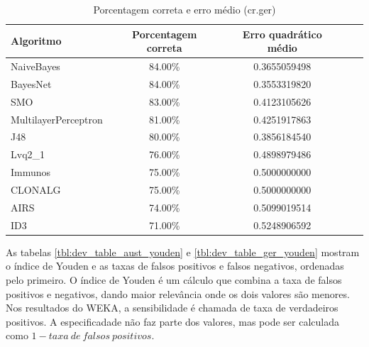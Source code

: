 \vspace{0.5cm}
\begin{table}[h!]
    \centering
    \caption{Porcentagem correta e erro médio (cr.ger)}
    \label{tbl:dev_table_ger_correct}
    \vspace{0.5cm}
    \begin{tabular}{|l|c|c|c|c|}
        \hline
        \textbf{Algoritmo} & \textbf{Porcentagem correta} & \textbf{Erro quadrático médio} \\
        \hline
        \rowcolor[gray]{.9}
        NaiveBayes           & 84.00\% & 0.3655059498 \\ \hline
        \rowcolor[gray]{.9}
        BayesNet             & 84.00\% & 0.3553319820 \\ \hline
        \rowcolor[gray]{.9}
        SMO                  & 83.00\% & 0.4123105626 \\ \hline
        MultilayerPerceptron & 81.00\% & 0.4251917863 \\ \hline
        J48                  & 80.00\% & 0.3856184540 \\ \hline
        Lvq2\_1              & 76.00\% & 0.4898979486 \\ \hline
        Immunos              & 75.00\% & 0.5000000000 \\ \hline
        CLONALG              & 75.00\% & 0.5000000000 \\ \hline
        AIRS                 & 74.00\% & 0.5099019514 \\ \hline
        ID3                  & 71.00\% & 0.5248906592 \\ \hline
    \end{tabular}
\end{table}
\vspace{0.5cm}

As tabelas \ref{tbl:dev_table_aust_youden} e \ref{tbl:dev_table_ger_youden} mostram o índice de Youden e as taxas de falsos positivos e falsos negativos, ordenadas pelo primeiro. O índice de Youden é um cálculo que combina a taxa de falsos positivos e negativos, dando maior relevância onde os dois valores são menores. Nos resultados do WEKA, a sensibilidade é chamada de taxa de verdadeiros positivos. A especificadade não faz parte dos valores, mas pode ser calculada como $1 - taxa\ de\ falsos\ positivos$.

